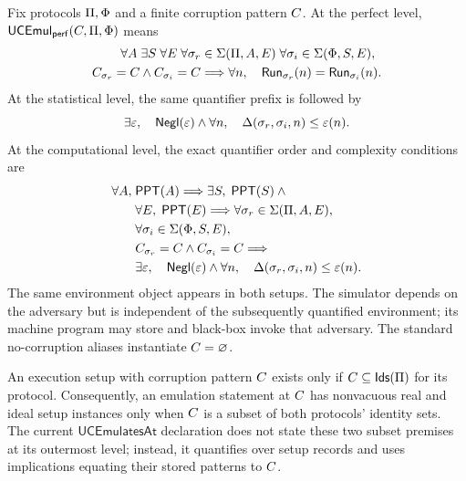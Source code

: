 \begin{definition}
\label{def:uc-emulation}
\leanok
Fix protocols \(\Pi,\Phi\) and a finite corruption pattern \(C\).  At
the perfect level, \(\mathsf{UCEmul}_{\mathsf{perf}}(C,\Pi,\Phi)\) means
\[
\begin{aligned}
  \forall A\;\exists S\;\forall E\;
  \forall\sigma_r&\in\Sigma(\Pi,A,E)\;
  \forall\sigma_i\in\Sigma(\Phi,S,E),\\
  C_{\sigma_r}=C\land C_{\sigma_i}=C
  &\Longrightarrow
  \forall n,\quad
  \mathsf{Run}_{\sigma_r}(n)=\mathsf{Run}_{\sigma_i}(n).
\end{aligned}
\]
At the statistical level, the same quantifier prefix is followed by
\[
  \exists\varepsilon,\quad
  \mathsf{Negl}(\varepsilon)\land
  \forall n,\quad
  \Delta(\sigma_r,\sigma_i,n)\le\varepsilon(n).
\]
At the computational level, the exact quantifier order and complexity
conditions are
\[
\begin{aligned}
  \forall A,\;&\mathsf{PPT}(A)\Longrightarrow
  \exists S,\;\mathsf{PPT}(S)\land{}\\
  &\forall E,\;\mathsf{PPT}(E)\Longrightarrow
  \forall\sigma_r\in\Sigma(\Pi,A,E),\\
  &\forall\sigma_i\in\Sigma(\Phi,S,E),\\
  &C_{\sigma_r}=C\land C_{\sigma_i}=C
  \Longrightarrow{}\\
  &\exists\varepsilon,\quad
  \mathsf{Negl}(\varepsilon)\land
  \forall n,\quad
  \Delta(\sigma_r,\sigma_i,n)\le\varepsilon(n).
\end{aligned}
\]
The same environment object appears in both setups.  The simulator depends on
the adversary but is independent of the subsequently quantified environment;
its machine program may store and black-box invoke that adversary.  The standard
no-corruption aliases instantiate \(C=\varnothing\).
\end{definition}

\begin{remark}
\label{rem:uc-corruption-pattern-legality}
An execution setup with corruption pattern \(C\) exists only if
\(C\subseteq\mathsf{Ids}(\Pi)\) for its protocol.  Consequently, an emulation
statement at \(C\) has nonvacuous real and ideal setup instances only when
\(C\) is a subset of both protocols' identity sets.  The current
\(\mathsf{UCEmulatesAt}\) declaration does not state these two subset premises
at its outermost level; instead, it quantifies over setup records and uses
implications equating their stored patterns to \(C\).
\end{remark}

